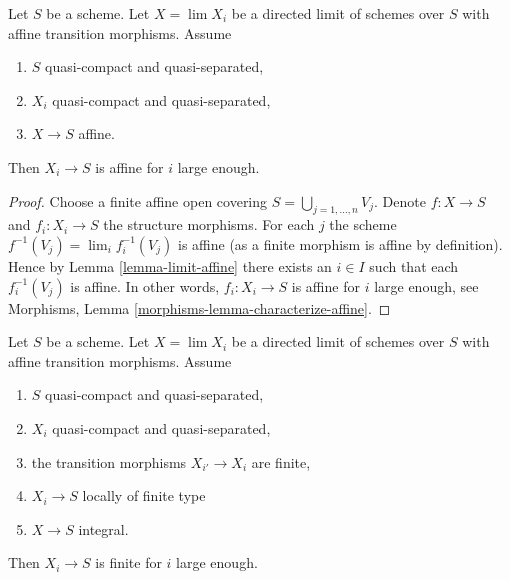 \begin{lemma}
\label{lemma-eventually-affine}
Let $S$ be a scheme. Let $X = \lim X_i$ be a directed limit of schemes
over $S$ with affine transition morphisms. Assume
\begin{enumerate}
\item $S$ quasi-compact and quasi-separated,
\item $X_i$ quasi-compact and quasi-separated,
\item $X \to S$ affine.
\end{enumerate}
Then $X_i \to S$ is affine for $i$ large enough.
\end{lemma}

\begin{proof}
Choose a finite affine open covering $S = \bigcup_{j = 1, \ldots, n} V_j$.
Denote $f : X \to S$ and $f_i : X_i \to S$ the structure morphisms.
For each $j$ the scheme $f^{-1}(V_j) = \lim_i f_i^{-1}(V_j)$
is affine (as a finite morphism is affine by definition). Hence by
Lemma \ref{lemma-limit-affine} there exists an $i \in I$ such that
each $f_i^{-1}(V_j)$ is affine. In other words, $f_i : X_i \to S$ is
affine for $i$ large enough, see
Morphisms, Lemma \ref{morphisms-lemma-characterize-affine}.
\end{proof}

\begin{lemma}
\label{lemma-eventually-finite}
Let $S$ be a scheme. Let $X = \lim X_i$ be a directed limit of schemes
over $S$ with affine transition morphisms. Assume
\begin{enumerate}
\item $S$ quasi-compact and quasi-separated,
\item $X_i$ quasi-compact and quasi-separated,
\item the transition morphisms $X_{i'} \to X_i$ are finite,
\item $X_i \to S$ locally of finite type
\item $X \to S$ integral.
\end{enumerate}
Then $X_i \to S$ is finite for $i$ large enough.
\end{lemma}

